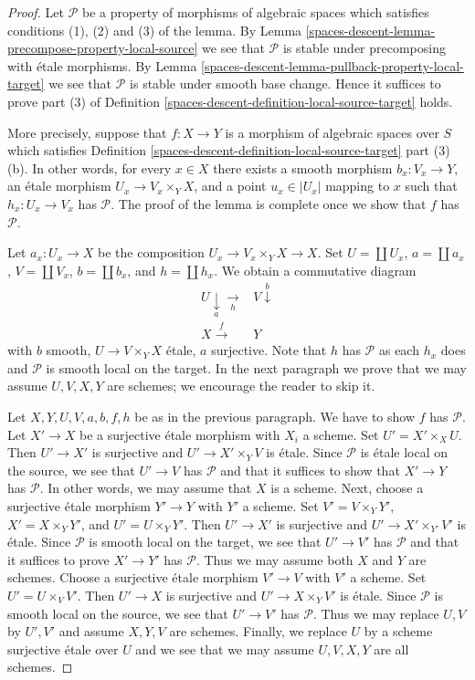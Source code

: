 \begin{proof}
Let $\mathcal{P}$ be a property of morphisms of algebraic spaces which
satisfies conditions (1), (2) and (3) of the lemma. By
Lemma \ref{spaces-descent-lemma-precompose-property-local-source}
we see that $\mathcal{P}$ is stable under precomposing with
\'etale morphisms. By
Lemma \ref{spaces-descent-lemma-pullback-property-local-target}
we see that $\mathcal{P}$ is stable under smooth base change.
Hence it suffices to prove part (3) of
Definition \ref{spaces-descent-definition-local-source-target}
holds.

\medskip\noindent
More precisely, suppose that $f : X \to Y$ is a morphism
of algebraic spaces over $S$ which satisfies
Definition \ref{spaces-descent-definition-local-source-target} part (3)(b).
In other words, for every $x \in X$ there exists
a smooth morphism $b_x : V_x \to Y$,
an \'etale morphism $U_x \to V_x \times_Y X$, and
a point $u_x \in |U_x|$ mapping to $x$
such that $h_x : U_x \to V_x$ has $\mathcal{P}$.
The proof of the lemma is complete once we show that $f$ has $\mathcal{P}$.

\medskip\noindent
Let $a_x : U_x \to X$ be the composition $U_x \to V_x \times_Y X \to X$.
Set $U = \coprod U_x$, $a = \coprod a_x$, $V = \coprod V_x$,
$b = \coprod b_x$, and $h = \coprod h_x$. We obtain a
commutative diagram
$$
\begin{array}{cc}U \underset{a}{\downarrow}\underset{h}{\longrightarrow} & V \overset{b}{\downarrow} \\ X \overset{f}{\longrightarrow} & Y\end{array}
$$
with $b$ smooth, $U \to V \times_Y X$ \'etale, $a$ surjective.
Note that $h$ has $\mathcal{P}$ as each $h_x$ does and $\mathcal{P}$
is smooth local on the target. In the next paragraph we prove
that we may assume $U, V, X, Y$ are schemes; we encourage the reader
to skip it.

\medskip\noindent
Let $X, Y, U, V, a, b, f, h$ be as in the previous paragraph. We have
to show $f$ has $\mathcal{P}$. Let $X' \to X$ be a surjective \'etale
morphism with $X_i$ a scheme. Set $U' = X' \times_X U$. Then
$U' \to X'$ is surjective and $U' \to X' \times_Y V$ is \'etale.
Since $\mathcal{P}$ is \'etale local on the source, we see that
$U' \to V$ has $\mathcal{P}$ and that it suffices to show that
$X' \to Y$ has $\mathcal{P}$. In other words, we may assume
that $X$ is a scheme. Next, choose a surjective \'etale morphism
$Y' \to Y$ with $Y'$ a scheme. Set $V' = V \times_Y Y'$,
$X' = X \times_Y Y'$, and $U' = U \times_Y Y'$. Then
$U' \to X'$ is surjective and $U' \to X' \times_{Y'} V'$ is \'etale.
Since $\mathcal{P}$ is smooth local on the target, we see that $U' \to V'$ has
$\mathcal{P}$ and that it suffices to prove $X' \to Y'$ has $\mathcal{P}$.
Thus we may assume both $X$ and $Y$ are schemes.
Choose a surjective \'etale morphism $V' \to V$
with $V'$ a scheme. Set $U' = U \times_V V'$.
Then $U' \to X$ is surjective and $U' \to X \times_Y V'$ is \'etale.
Since $\mathcal{P}$ is smooth local on the source, we see that
$U' \to V'$ has $\mathcal{P}$. Thus we may replace $U, V$ by
$U', V'$ and assume $X, Y, V$ are schemes.
Finally, we replace $U$ by a scheme surjective \'etale over $U$
and we see that we may assume $U, V, X, Y$ are all schemes.


\end{proof}
